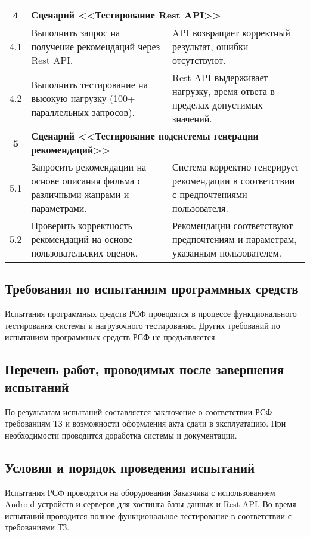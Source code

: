 \begin{longtable}{|c|p{7.5cm}|p{7.5cm}|}
	\textbf{4}
	& \multicolumn{2}{|l|}{\textbf{Сценарий <<Тестирование Rest API>>}} \\ \hline
	4.1
	& Выполнить запрос на получение рекомендаций через Rest API.
	& API возвращает корректный результат, ошибки отсутствуют. \\ \hline

	4.2
	& Выполнить тестирование на высокую нагрузку (100+ параллельных запросов).
	& Rest API выдерживает нагрузку, время ответа в пределах допустимых значений. \\ \hline

	\textbf{5}
	& \multicolumn{2}{|l|}{\textbf{Сценарий <<Тестирование подсистемы генерации рекомендаций>>}} \\ \hline
	5.1
	& Запросить рекомендации на основе описания фильма с различными жанрами и параметрами.
	& Система корректно генерирует рекомендации в соответствии с предпочтениями пользователя. \\ \hline

	5.2
	& Проверить корректность рекомендаций на основе пользовательских оценок.
	& Рекомендации соответствуют предпочтениям и параметрам, указанным пользователем. \\ \hline
\end{longtable}

\subsection{Требования по испытаниям программных средств}

Испытания программных средств РСФ проводятся в процессе функционального тестирования системы и нагрузочного тестирования. Других требований по испытаниям программных средств РСФ не предъявляется.

\subsection{Перечень работ, проводимых после завершения испытаний}

По результатам испытаний составляется заключение о соответствии РСФ требованиям ТЗ и возможности оформления акта сдачи в эксплуатацию. При необходимости проводится доработка системы и документации.

\subsection{Условия и порядок проведения испытаний}

Испытания РСФ проводятся на оборудовании Заказчика с использованием Android-устройств и серверов для хостинга базы данных и Rest API. Во время испытаний проводится полное функциональное тестирование в соответствии с требованиями ТЗ.

